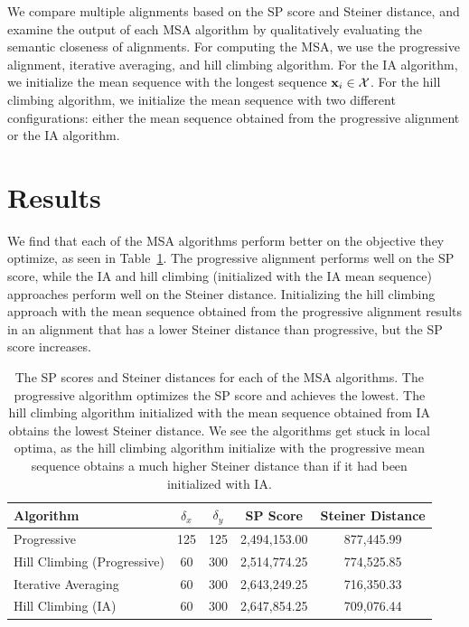 \documentclass{article}
\begin{document}
We compare multiple alignments based on the SP score and Steiner distance,
and examine the output of each MSA algorithm by qualitatively evaluating the 
semantic closeness of alignments.
For computing the MSA, we use the progressive alignment, iterative averaging,
and hill climbing algorithm.
For the IA algorithm, we initialize the mean sequence with the longest sequence $\mathbf{x}_i \in \mathcal{X}$.
For the hill climbing algorithm, we initialize the mean sequence with
two different configurations:
either the mean sequence obtained from the progressive alignment or the IA algorithm.

\section{Results}
We find that each of the MSA algorithms perform better on the objective they optimize,
as seen in Table~\ref{tbl:sp_steiner}.
The progressive alignment performs well on the SP score,
while the IA and hill climbing (initialized with the IA mean sequence)
approaches perform well on the Steiner distance.
Initializing the hill climbing approach with the mean sequence obtained from 
the progressive alignment results in an alignment that has a lower Steiner distance
than progressive, but the SP score increases.

\begin{table}[h]
\centering
\begin{tabular}[h]{|l|c|c|c|c|}
\hline
\bf{Algorithm}              & $\delta_x$ & $\delta_y$ & \bf{SP Score} & \bf{Steiner Distance}\\
\hline
Progressive                 & 125        & 125        & 2,494,153.00  & 877,445.99 \\
Hill Climbing (Progressive) & 60         & 300        & 2,514,774.25  & 774,525.85\\
Iterative Averaging         & 60         & 300        & 2,643,249.25  & 716,350.33\\
Hill Climbing (IA)          & 60         & 300        & 2,647,854.25  & 709,076.44\\
\hline
\end{tabular}
\caption{
\label{tbl:sp_steiner}
The SP scores and Steiner distances for each of the MSA algorithms.
The progressive algorithm optimizes the SP score and achieves the lowest.
The hill climbing algorithm initialized with the mean sequence obtained from IA
obtains the lowest Steiner distance.
We see the algorithms get stuck in local optima, as the hill climbing algorithm
initialize with the progressive mean sequence obtains a much higher
Steiner distance than if it had been initialized with IA.
}
\end{table}
\end{document}
